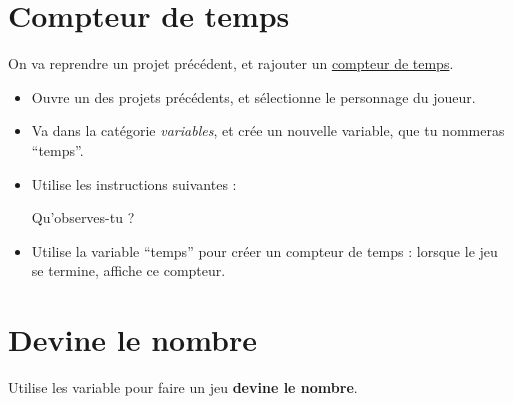\documentclass[a4paper,12pt]{article}
\newcommand{\racineDeDeux}{1.41421}
\newcommand{\blockHeight}{0.9}
\newcommand{\blockWidth}{9}
\newcommand{\clipPosition}{1.5}
\newcommand{\clipHeight}{0.15}
\newcommand{\arcStartRadius}{2}
\newcounter{codeBlockCounter}
\newcounter{codeBlockCounterBinary}
\newcommand{\startInstruction}[1]{
	\coordinate (BlockStart) at (0,-\thecodeBlockCounter*\blockHeight);
	\ifthenelse{\equal{\thecodeBlockCounterBinary}{0}}{
		\addtocounter{codeBlockCounterBinary}{1}
		\draw[fill=block1] (BlockStart)
			arc (135:45:\arcStartRadius)
			-- ++(\blockWidth-\arcStartRadius*\racineDeDeux,0)
			-- ++(0,-\blockHeight)
			-- ++(-\blockWidth+\clipPosition+2.5*\clipHeight,0)
			-- ++(-\clipHeight,-\clipHeight)
			-- ++(-\clipHeight/2,0)
			-- ++(-\clipHeight,\clipHeight)
			-- ++(-\clipPosition,0)
			-- ++(0,\blockHeight);
	}{
		\addtocounter{codeBlockCounterBinary}{-1}
		\draw[fill=block2] (BlockStart)
			arc (135:45:\arcStartRadius)
			-- ++(\blockWidth-\arcStartRadius*\racineDeDeux,0)
			-- ++(0,-\blockHeight)
			-- ++(-\blockWidth+\clipPosition+2.5*\clipHeight,0)
			-- ++(-\clipHeight,-\clipHeight)
			-- ++(-\clipHeight/2,0)
			-- ++(-\clipHeight,\clipHeight)
			-- ++(-\clipPosition,0)
			-- ++(0,\blockHeight);
	}
	\node[anchor=west] at (0.5,-\thecodeBlockCounter*\blockHeight - \blockHeight/2) {#1};
	\addtocounter{codeBlockCounter}{1}
}
\newcommand{\instruction}[1]{
	\coordinate (BlockStart) at (0,-\thecodeBlockCounter*\blockHeight);
	\ifthenelse{\equal{\thecodeBlockCounterBinary}{0}}{
		\addtocounter{codeBlockCounterBinary}{1}
		\draw[fill=block1] (BlockStart)
			-- ++(\clipPosition,0)
			-- ++(\clipHeight,-\clipHeight)
			-- ++(\clipHeight/2,0)
			-- ++(\clipHeight,\clipHeight)
			-- ++(\blockWidth-\clipPosition-2.5*\clipHeight,0)
			-- ++(0,-\blockHeight)
			-- ++(-\blockWidth+\clipPosition+2.5*\clipHeight,0)
			-- ++(-\clipHeight,-\clipHeight)
			-- ++(-\clipHeight/2,0)
			-- ++(-\clipHeight,\clipHeight)
			-- ++(-\clipPosition,0)
			-- ++(0,\blockHeight);
	}{
		\addtocounter{codeBlockCounterBinary}{-1}
		\draw[fill=block2] (BlockStart)
			-- ++(\clipPosition,0)
			-- ++(\clipHeight,-\clipHeight)
			-- ++(\clipHeight/2,0)
			-- ++(\clipHeight,\clipHeight)
			-- ++(\blockWidth-\clipPosition-2.5*\clipHeight,0)
			-- ++(0,-\blockHeight)
			-- ++(-\blockWidth+\clipPosition+2.5*\clipHeight,0)
			-- ++(-\clipHeight,-\clipHeight)
			-- ++(-\clipHeight/2,0)
			-- ++(-\clipHeight,\clipHeight)
			-- ++(-\clipPosition,0)
			-- ++(0,\blockHeight);
	}
	\node[anchor=west] at (0.5,-\thecodeBlockCounter*\blockHeight - \blockHeight/2) {#1};
	\addtocounter{codeBlockCounter}{1}
}
\begin{document}
\maketitle

\section*{Compteur de temps}

On va reprendre un projet précédent, et rajouter un \uline{compteur de temps}.

\begin{itemize}
	\item Ouvre un des projets précédents, et sélectionne le personnage du joueur.
	\item Va dans la catégorie \textit{variables}, et crée un nouvelle variable, que tu nommeras “temps”.
	\item Utilise les instructions suivantes :

	      \begin{center}
	      \end{center}


	      Qu'observes-tu ? \dotfill
	\item Utilise la variable “temps” pour créer un compteur de temps : lorsque le jeu se termine, affiche ce compteur.
\end{itemize}

\section*{Devine le nombre}

Utilise les variable pour faire un jeu \textbf{devine le nombre}.
\end{document}
